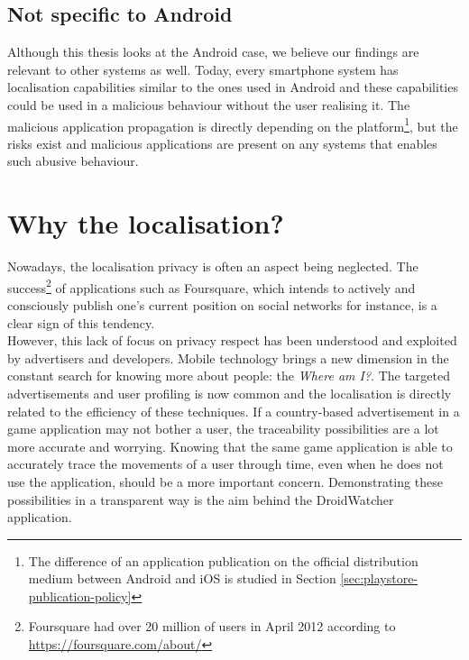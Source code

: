 \subsection*{Not specific to Android}
Although this thesis looks at the Android case, we believe our findings are relevant to other systems as well.
Today, every smartphone system has localisation capabilities similar to the ones used in Android and these capabilities could be used in a malicious behaviour without the user realising it.
The malicious application propagation is directly depending on the platform\footnote{The difference of an application publication on the official distribution medium between Android and iOS is studied in Section \ref{sec:playstore-publication-policy}}, but the risks exist and malicious applications are present on any systems that enables such abusive behaviour.

\section*{Why the localisation?}
\label{sec:why-localisation}

Nowadays, the localisation privacy is often an aspect being neglected.
The success\footnote{Foursquare had over 20 million of users in April 2012 according to \url{https://foursquare.com/about/}} of applications such as Foursquare, which intends to actively and consciously publish one's current position on social networks for instance, is a clear sign of this tendency.\\

However, this lack of focus on privacy respect has been understood and exploited by advertisers and developers.
Mobile technology brings a new dimension in the constant search for knowing more about people: the \emph{Where am I?}.
The targeted advertisements and user profiling is now common and the localisation is directly related to the efficiency of these techniques.
If a country-based advertisement in a game application may not bother a user, the traceability possibilities are a lot more accurate and worrying.
Knowing that the same game application is able to accurately trace the movements of a user through time, even when he does not use the application, should be a more important concern.
Demonstrating these possibilities in a transparent way is the aim behind the DroidWatcher application.\\

